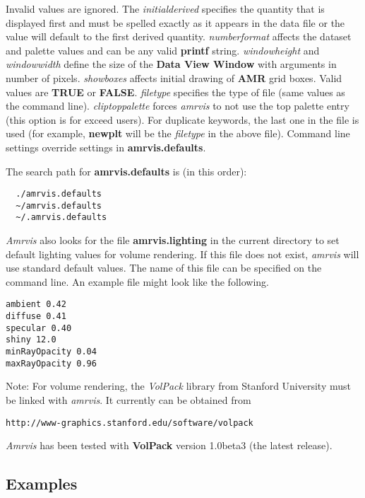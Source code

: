 \documentclass{article}
\begin{document}
Invalid values are ignored.  The {\em initialderived} specifies the
quantity that is displayed first and must be spelled
exactly as it appears in the data file or the value will default to
the first derived quantity.  {\em numberformat} affects the dataset and
palette values and can be any valid {\bf printf} string.
{\em windowheight} and {\em windowwidth} define the size
of the {\bf Data View Window} with arguments in number of pixels.
{\em showboxes} affects initial drawing of {\bf AMR} grid boxes.  Valid
values are {\bf TRUE} or {\bf FALSE}.
{\em filetype} specifies the type of file (same values as the command line).
{\em cliptoppalette} forces {\em amrvis} to not use the top palette entry
(this option is for exceed users).
For duplicate keywords, the last one in the file is used (for example, {\bf newplt}
will be the {\em filetype} in the above file).  Command line settings
override settings in {\bf amrvis.defaults}.

The search path for {\bf amrvis.defaults} is (in this order):

\begin{verbatim}
  ./amrvis.defaults
  ~/amrvis.defaults
  ~/.amrvis.defaults
\end{verbatim}


{\em Amrvis} also looks for the file {\bf amrvis.lighting} in the
current directory to set default lighting values for volume rendering.  If
this file does not exist, {\em amrvis} will use standard default
values.  The name of this file can be specified on the command line.  An example
file might look like the following.

\begin{verbatim}
ambient 0.42
diffuse 0.41
specular 0.40
shiny 12.0
minRayOpacity 0.04
maxRayOpacity 0.96
\end{verbatim}

Note:  For volume rendering, the {\em VolPack} library from Stanford University
must be linked with {\em amrvis}.  It currently can be obtained from

\begin{verbatim}
http://www-graphics.stanford.edu/software/volpack
\end{verbatim}

{\em Amrvis} has been tested with {\bf VolPack} version 1.0beta3 (the
latest release).


\subsection{Examples}
\end{document}
